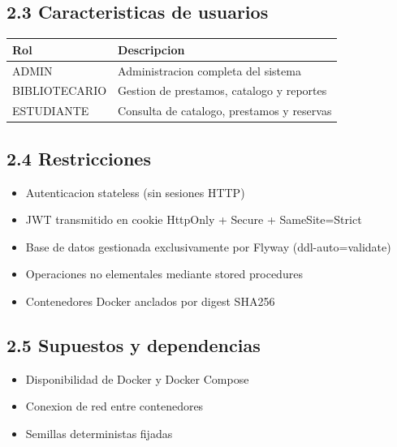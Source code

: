 \documentclass[
11pt,
a4paper,
]{report}
\providecommand{\tightlist}{%
	\setlength{\itemsep}{0pt}\setlength{\parskip}{0pt}}
\begin{document}
	\hypertarget{caracteristicas-de-usuarios}{%
		\subsection{2.3 Caracteristicas de usuarios}\label{caracteristicas-de-usuarios}}
	
	\begin{longtable}[]{@{}ll@{}}
		\toprule\noalign{}
		Rol & Descripcion \\
		\midrule\noalign{}
		\endhead
		\bottomrule\noalign{}
		\endlastfoot
		ADMIN & Administracion completa del sistema \\
		BIBLIOTECARIO & Gestion de prestamos, catalogo y reportes \\
		ESTUDIANTE & Consulta de catalogo, prestamos y reservas \\
	\end{longtable}
	
	\hypertarget{restricciones}{%
		\subsection{2.4 Restricciones}\label{restricciones}}
	
	\begin{itemize}
		\tightlist
		\item
		Autenticacion stateless (sin sesiones HTTP)
		\item
		JWT transmitido en cookie HttpOnly + Secure + SameSite=Strict
		\item
		Base de datos gestionada exclusivamente por Flyway (ddl-auto=validate)
		\item
		Operaciones no elementales mediante stored procedures
		\item
		Contenedores Docker anclados por digest SHA256
	\end{itemize}
	
	\hypertarget{supuestos-y-dependencias}{%
		\subsection{2.5 Supuestos y dependencias}\label{supuestos-y-dependencias}}
	
	\begin{itemize}
		\tightlist
		\item
		Disponibilidad de Docker y Docker Compose
		\item
		Conexion de red entre contenedores
		\item
		Semillas deterministas fijadas
	\end{itemize}
	
\end{document}
